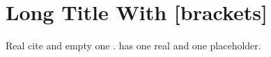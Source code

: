 \documentclass{article}
\begin{document}
\section[Short]{Long Title With [brackets]}
Real cite \citep[see][p.10]{realkey} and empty one \citep[][p.9]{TODO}.
\cite{real_key, TODO} has one real and one placeholder.
\end{document}
